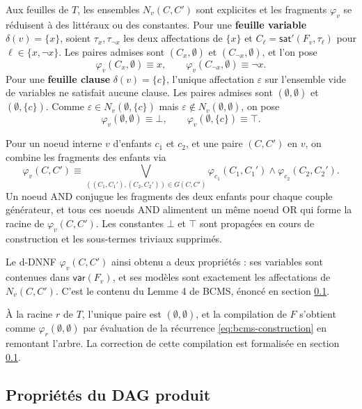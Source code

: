 \documentclass[11pt,a4paper]{report}
\theoremstyle{plain}
\theoremstyle{definition}
\begin{document}
Aux feuilles de $T$, les ensembles $N_v(C, C')$ sont explicites et les
fragments $\varphi_v$ se réduisent à des littéraux ou des constantes.
Pour une \textbf{feuille variable} $\delta(v) = \{x\}$, soient
$\tau_x, \tau_{\neg x}$ les deux affectations de $\{x\}$ et
$C_\ell = \mathsf{sat}'(F_v, \tau_\ell)$ pour $\ell \in \{x, \neg x\}$.
Les paires admises sont $(C_x, \emptyset)$ et $(C_{\neg x}, \emptyset)$,
et l'on pose
\[
  \varphi_v(C_x, \emptyset) \equiv x,
  \qquad
  \varphi_v(C_{\neg x}, \emptyset) \equiv \neg x.
\]
Pour une \textbf{feuille clause} $\delta(v) = \{c\}$, l'unique
affectation $\varepsilon$ sur l'ensemble vide de variables ne satisfait
aucune clause. Les paires admises sont $(\emptyset, \emptyset)$ et
$(\emptyset, \{c\})$. Comme $\varepsilon \in N_v(\emptyset, \{c\})$
mais $\varepsilon \notin N_v(\emptyset, \emptyset)$, on pose
\[
  \varphi_v(\emptyset, \emptyset) \equiv \bot,
  \qquad
  \varphi_v(\emptyset, \{c\}) \equiv \top.
\]

Pour un noeud interne $v$ d'enfants $c_1$ et $c_2$, et une paire
$(C, C')$ en $v$, on combine les fragments des enfants via
\begin{equation}
  \varphi_v(C, C') \equiv
  \bigvee_{((C_1, C_1'), (C_2, C_2')) \in G(C, C')}
  \varphi_{c_1}(C_1, C_1') \wedge \varphi_{c_2}(C_2, C_2').
  \label{eq:bcms-construction}
\end{equation}
Un noeud AND conjugue les fragments des deux enfants pour chaque couple
générateur, et tous ces noeuds AND alimentent un même noeud OR qui forme
la racine de $\varphi_v(C, C')$. Les constantes $\bot$ et $\top$ sont
propagées en cours de construction et les sous-termes triviaux
supprimés.

Le d-DNNF $\varphi_v(C, C')$ ainsi obtenu a deux propriétés : ses
variables sont contenues dans $\mathsf{var}(F_v)$, et ses modèles sont
exactement les affectations de $N_v(C, C')$. C'est le contenu du
Lemme 4 de BCMS, énoncé en
section \ref{ssec:theo-bcms-properties}.

À la racine $r$ de $T$, l'unique paire est $(\emptyset, \emptyset)$, et
la compilation de $F$ s'obtient comme $\varphi_r(\emptyset, \emptyset)$
par évaluation de la récurrence \eqref{eq:bcms-construction} en
remontant l'arbre. La correction de cette compilation est formalisée
en section \ref{ssec:theo-bcms-properties}.

\subsection{Propriétés du DAG produit}
\label{ssec:theo-bcms-properties}
\end{document}
